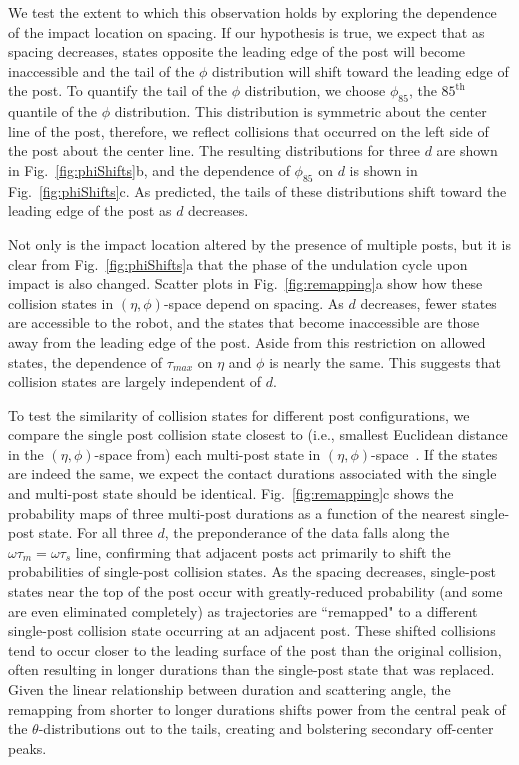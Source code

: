 \documentclass[aps,pre,twocolumn,superscriptaddress]{revtex4-1}
\begin{document}
We test the extent to which this observation holds by exploring the dependence of the impact location on spacing.  If our hypothesis is true, we expect that as spacing decreases, states opposite the leading edge of the post will become inaccessible and the tail of the $\phi$ distribution will shift toward the leading edge of the post.  To quantify the tail of the $\phi$ distribution, we choose $\phi_{85}$, the $85^\mathrm{th}$ quantile of the $\phi$ distribution.  This distribution is symmetric about the center line of the post, therefore, we reflect collisions that occurred on the left side of the post about the center line. The resulting distributions for three $d$ are shown in Fig.~\ref{fig:phiShifts}b, and the dependence of $\phi_{85}$ on $d$ is shown in Fig.~\ref{fig:phiShifts}c.  As predicted, the tails of these distributions shift toward the leading edge of the post as $d$ decreases.

Not only is the impact location altered by the presence of multiple posts, but it is clear from Fig.~\ref{fig:phiShifts}a that the phase of the undulation cycle upon impact is also changed. Scatter plots in Fig.~\ref{fig:remapping}a show how these collision states in $(\eta,\phi)$-space depend on spacing. As $d$ decreases, fewer states are accessible to the robot, and the states that become inaccessible are those away from the leading edge of the post. Aside from this restriction on allowed states, the dependence of $\tau_{max}$ on $\eta$ and $\phi$ is nearly the same.  This suggests that collision states are largely independent of $d$. 

To test the similarity of collision states for different post configurations, we compare the single post collision state closest to (i.e., smallest Euclidean distance in the $(\eta,\phi)$-space from) each multi-post state in $(\eta,\phi)$-space~\cite{supplemental}. If the states are indeed the same, we expect the contact durations associated with the single and multi-post state should be identical. Fig.~\ref{fig:remapping}c shows the probability maps of three multi-post durations as a function of the nearest single-post state. For all three $d$, the preponderance of the data falls along the $\omega \tau_m = \omega \tau_s$ line, confirming that adjacent posts act primarily to shift the probabilities of single-post collision states. As the spacing decreases, single-post states near the top of the post occur with greatly-reduced probability (and some are even eliminated completely) as trajectories are ``remapped" to a different single-post collision state occurring at an adjacent post. These shifted collisions tend to occur closer to the leading surface of the post than the original collision, often resulting in longer durations than the single-post state that was replaced. Given the linear relationship between duration and scattering angle, the remapping from shorter to longer durations shifts power from the central peak of the $\theta$-distributions out to the tails, creating and bolstering secondary off-center peaks. 
\end{document}
